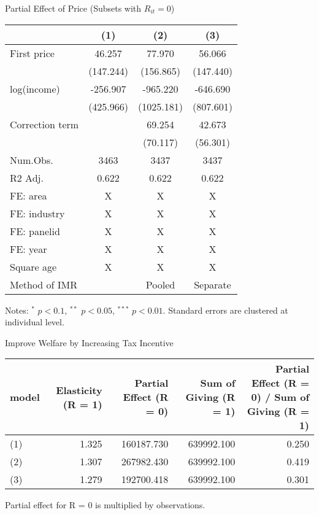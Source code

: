 \documentclass[
  ignorenonframetext,
  aspectratio=169,
]{beamer}
\begin{document}
\begin{frame}{Partial Effect of Price (Subsets with \(R_{it} = 0\))}
\protect\hypertarget{partial-effect-of-price-subsets-with-r_it-0}{}
\begin{table}
\centering
\fontsize{7}{9}\selectfont
\begin{threeparttable}
\begin{tabular}[t]{lccc}
\toprule
  & (1) & (2) & (3)\\
\midrule
First price & 46.257 & 77.970 & 56.066\\
 & (147.244) & (156.865) & (147.440)\\
log(income) & -256.907 & -965.220 & -646.690\\
 & (425.966) & (1025.181) & (807.601)\\
Correction term &  & 69.254 & 42.673\\
 &  & (70.117) & (56.301)\\
\midrule
Num.Obs. & 3463 & 3437 & 3437\\
R2 Adj. & 0.622 & 0.622 & 0.622\\
FE: area & X & X & X\\
FE: industry & X & X & X\\
FE: panelid & X & X & X\\
FE: year & X & X & X\\
Square age & X & X & X\\
Method of IMR &  & Pooled & Separate\\
\bottomrule
\end{tabular}
\begin{tablenotes}
\item Notes: $^{*}$ $p < 0.1$, $^{**}$ $p < 0.05$, $^{***}$ $p < 0.01$. Standard errors are clustered at individual level.
\end{tablenotes}
\end{threeparttable}
\end{table}
\end{frame}

\begin{frame}{Improve Welfare by Increasing Tax Incentive}
\protect\hypertarget{improve-welfare-by-increasing-tax-incentive}{}
\begin{table}
\centering
\fontsize{6}{8}\selectfont
\begin{threeparttable}
\begin{tabular}[t]{lrrrr}
\toprule
model & Elasticity (R = 1) & Partial Effect (R = 0) & Sum of Giving (R = 1) & Partial Effect (R = 0) / Sum of Giving (R = 1)\\
\midrule
(1) & 1.325 & 160187.730 & 639992.100 & 0.250\\
(2) & 1.307 & 267982.430 & 639992.100 & 0.419\\
(3) & 1.279 & 192700.418 & 639992.100 & 0.301\\
\bottomrule
\end{tabular}
\begin{tablenotes}
\item Partial effect for R = 0 is multiplied by observations.
\end{tablenotes}
\end{threeparttable}
\end{table}
\end{frame}
\end{document}
